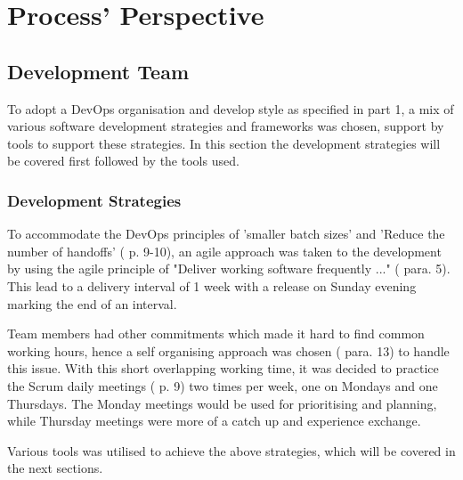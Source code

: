 \documentclass[report/main.tex]{subfiles}
\begin{document}
    \section{Process' Perspective}
    \label{Sec:process_perspective}
        \subsection{Development Team}
        \label{subsec:development-team}
            To adopt a DevOps organisation and develop style as specified in \cite{devops-handbook} part 1, a mix of various software development strategies and frameworks was chosen, support by tools to support these strategies. In this section the development strategies will be covered first followed by the tools used.
            
            \subsubsection{Development Strategies}
            \label{subsubsec:development-strategies}
                To accommodate the DevOps principles of 'smaller batch sizes' and 'Reduce the number of handoffs' (\cite{devops-handbook} p. 9-10), an agile approach was taken to the development by using the agile principle of "Deliver working software frequently ..." (\cite{agile-manifesto-second-page} para. 5). This lead to a delivery interval of 1 week with a release on Sunday evening marking the end of an interval.
                
                Team members had other commitments which made it hard to find common working hours, hence a self organising approach was chosen (\cite{agile-manifesto-second-page} para. 13) to handle this issue. With this short overlapping working time, it was decided to practice the Scrum daily meetings (\cite{2020-scrum-guide} p. 9) two times per week, one on Mondays and one Thursdays. The Monday meetings would be used for prioritising and planning, while Thursday meetings were more of a catch up and experience exchange.
                
                Various tools was utilised to achieve the above strategies, which will be covered in the next sections.
                
        
\end{document}
